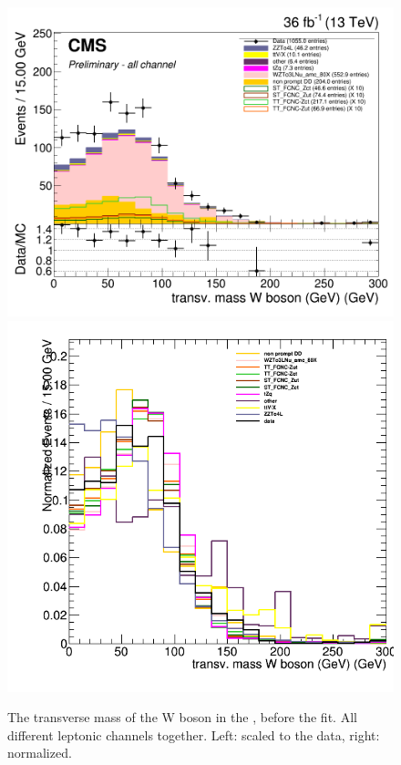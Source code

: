 \begin{figure}[htbp]
	\centering
	  \includegraphics[width=0.39\linewidth]{6_Search/Figures/MSPlotMTW/MTW_all_Stack}
	  \includegraphics[width=0.37\linewidth]{6_Search/Figures/MSPlotMTW/MTW_all_Normalized}
	\caption{The transverse mass of the W boson in the \WZCR, before the fit. All different leptonic channels together. Left: scaled to the data, right: normalized.}
	\label{fig:mtwallstack}
\end{figure}



